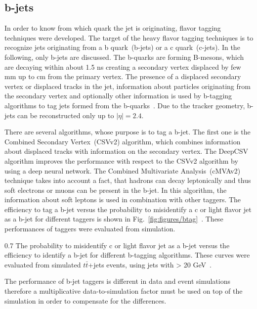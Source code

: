 \subsection{b-jets}

In order to know from which quark the jet is originating, flavor tagging techniques were developed. The target of the heavy flavor tagging techniques is to recognize jets originating from a b quark~(b-jets) or a c quark~(c-jets). In the following, only b-jets are discussed. The b-quarks are forming B-mesons, which are decaying within about 1.5 ns creating a secondary vertex displaced by few mm up to cm from the primary vertex. The presence of a displaced secondary vertex or displaced tracks in the jet, information about particles originating from the secondary vertex and optionally other information is used by b-tagging algorithms to tag jets formed from the b-quarks~\cite{Sirunyan:2017ezt}. Due to the tracker geometry, b-jets can be reconstructed only up to $|\eta|=2.4$.

There are several algorithms, whose purpose is to tag a b-jet. The first one is the Combined Secondary Vertex~(CSVv2) algorithm, which combines information about displaced tracks with information on the secondary vertex. The DeepCSV algorithm improves the performance with respect to the CSVv2 algorithm by using a deep neural network. The Combined Multivariate Analysis~(cMVAv2) technique takes into account a fact, that hadrons can decay leptonically and thus soft electrons or muons can be present in the b-jet. In this algorithm, the information about soft leptons is used in combination with other taggers. The efficiency to tag a b-jet versus the probability to misidentify a c or light flavor jet as a b-jet for different taggers is shown in Fig.~\ref{fig:figures/btag}~\cite{Sirunyan:2017ezt}. These performances of taggers were evaluated from simulation.


                 {0.7}       %
                 { The probability to misidentify c or light flavor jet as a b-jet versus the efficiency to identify a b-jet for different b-tagging algorithms. These curves were evaluated from simulated $t\bar{t}$+jets events, using jets with \pt > 20 GeV~\cite{Sirunyan:2017ezt}. }

The performance of b-jet taggers is different in data and event simulations therefore a multiplicative data-to-simulation factor must be used on top of the simulation in order to compensate for the differences.

